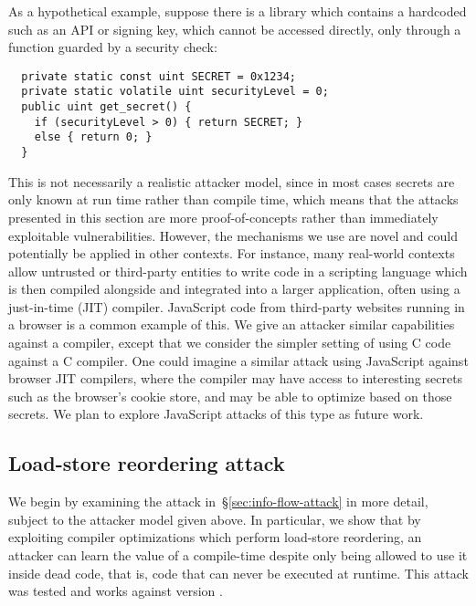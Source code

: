 As a hypothetical example, suppose there is a library which contains
a hardcoded {\SEC} such as an API or signing key, which cannot be accessed
directly, only through a function guarded by a security check:
\begin{verbatim}
  private static const uint SECRET = 0x1234;
  private static volatile uint securityLevel = 0;
  public uint get_secret() {
    if (securityLevel > 0) { return SECRET; }
    else { return 0; }
  }
\end{verbatim}
This is not necessarily a realistic attacker model,
since in most cases secrets are only known at run time rather than compile time,
which means that the attacks presented in this section
are more proof-of-concepts rather than immediately exploitable vulnerabilities.
However, the mechanisms we use are novel and could potentially be applied
in other contexts.
For instance, many real-world contexts allow untrusted or
third-party entities to write code in a scripting language which is then
compiled alongside and integrated into a larger application, often
using a just-in-time (JIT) compiler.
JavaScript code from third-party websites running in a browser is a common
example of this.
We give an attacker similar capabilities against a
compiler, except that we consider the simpler setting of using C code against a C
compiler.
One could imagine a similar attack using JavaScript against browser JIT
compilers, where the compiler may have access to interesting secrets such as the
browser's cookie store, and may be able to optimize based on those secrets.
We plan to explore JavaScript attacks of this type as future work.

\subsection{Load-store reordering attack}
\label{subsec:exp-rel-mem}

We begin by examining the attack in~\S\ref{sec:info-flow-attack} in
more detail, subject to the attacker model given above.
In particular, we show that by exploiting compiler optimizations which perform
load-store reordering, an attacker can learn the value of a compile-time
{\SEC} despite only being allowed to use it inside dead code, that is,
code that can never be executed at runtime.
This attack was tested and works against {\GCC} version .

